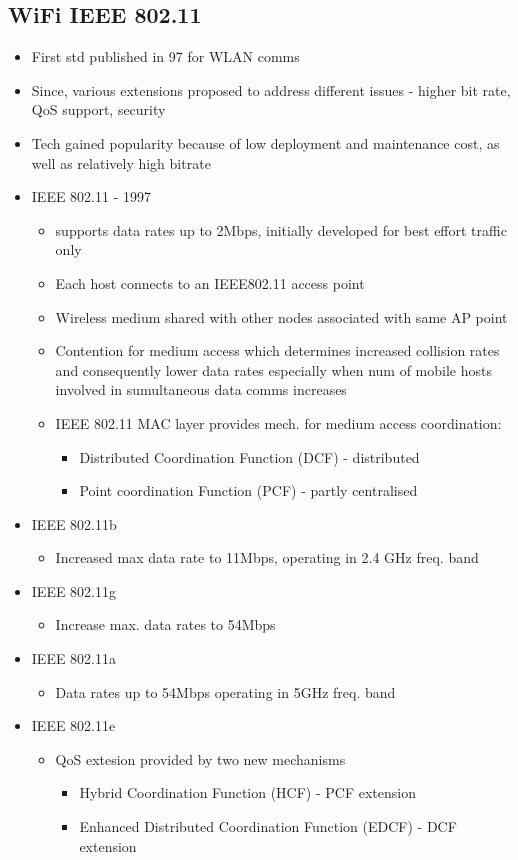 \documentclass[a4paper]{article}
\begin{document}
\subsection{WiFi IEEE 802.11}
\begin{itemize}
	\item First std published in 97 for WLAN comms
	\item Since, various extensions proposed to address different issues -
		higher bit rate, QoS support, security
	\item Tech gained popularity because of low deployment and maintenance
		cost, as well as relatively high bitrate
	\item IEEE 802.11 - 1997
	\begin{itemize}
		\item supports data rates up to 2Mbps, initially developed for
			best effort traffic only
		\item Each host connects to an IEEE802.11 access point
		\item Wireless medium shared with other nodes associated with
			same AP point
		\item Contention for medium access which determines increased
			collision rates and consequently lower data rates
			especially when num of mobile hosts involved in
			sumultaneous data comms increases
		\item IEEE 802.11 MAC layer provides mech. for medium access
			coordination:
		\begin{itemize}
			\item Distributed Coordination Function (DCF) -
				distributed
			\item Point coordination Function (PCF) - partly
				centralised
		\end{itemize}
	\end{itemize}
	\item IEEE 802.11b
	\begin{itemize}
		\item Increased max data rate to 11Mbps, operating in 2.4 GHz
			freq. band
	\end{itemize}
	\item IEEE 802.11g
	\begin{itemize}
		\item Increase max. data rates to 54Mbps
	\end{itemize}
	\item IEEE 802.11a
	\begin{itemize}
		\item Data rates up to 54Mbps operating in 5GHz freq. band
	\end{itemize}
	\item IEEE 802.11e
	\begin{itemize}
		\item QoS extesion provided by two new mechanisms
		\begin{itemize}
			\item Hybrid Coordination Function (HCF) - PCF extension
			\item Enhanced Distributed Coordination Function (EDCF)
				- DCF extension
		\end{itemize}
	\end{itemize}
\end{itemize}
\end{document}
